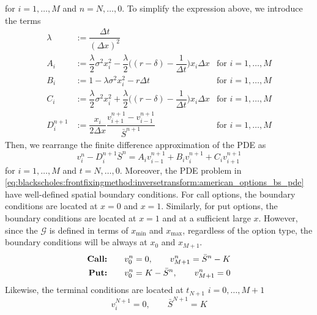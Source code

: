 for $i = 1, \dots, M$ and $n = N, \dots, 0$. To simplify the expression above, we introduce the terms 
\begin{align*}
  \lambda &:= \dfrac{\Delta{t}}{(\Delta{x})^2} \\
  A_i &:= \dfrac{\lambda}{2}\sigma^2x^{2}_i - \dfrac{\lambda}{2}\bigg((r-\delta) - \dfrac{1}{\Delta{t}}\bigg)x_i\Delta{x} & \text{for $i = 1, \dots, M$} \\ 
  B_i &:= 1 - \lambda\sigma^2x_i^2 - r\Delta{t} & \text{for $i = 1, \dots, M$} \\
  C_i &:= \dfrac{\lambda}{2}\sigma^2x^{2}_i + \dfrac{\lambda}{2}\bigg((r-\delta) - \dfrac{1}{\Delta{t}}\bigg)x_i\Delta{x} &  \text{for $i = 1, \dots, M$} \\
  D^{n+1}_{i} &:= \dfrac{x_i}{2\Delta{x}}\dfrac{v^{n+1}_{i+1} - v^{n+1}_{i-1}}{\bar{S}^{n+1}} &  \text{for $i = 1, \dots, M$}
\end{align*}
Then, we rearrange the finite difference approximation of the PDE as 
\begin{equation}
  v^{n}_{i} - D^{n+1}_{i}\bar{S}^n = A_i v^{n+1}_{i-1} + B_{i}v^{n+1}_{i} + C_{i}v^{n+1}_{i+1}
  \label{eq:finitediferencesschemes:explicit:pde_simplified}
\end{equation}
for $i = 1, \dots, M$ and $t = N, \dots, 0$. Moreover, the PDE problem in \eqref{eq:blackscholes:frontfixingmethod:inversetransform:american_options_bs_pde} have well-defined spatial boundary conditions. For call options, the boundary conditions are located at $x=0$ and $x=1$. Similarly, for put options, the boundary conditions are located at $x=1$ and at a sufficient large $x$. However, since the $\mathcal{G}$ is defined in terms of $x_\text{min}$ and $x_\text{max}$, regardless of the option type, the boundary conditions will be always at $x_0$ and $x_{M+1}$.
\begin{subequations}
  \label{eq:finitediferencesschemes:explicit:boundary_conditions}
  \begin{align}
    \text{\textbf{Call:}} \qquad & v^{n}_{0} = 0, \qquad v^{n}_{M+1} = \bar{S}^{n} - K\\
    \text{\textbf{Put:}} \qquad & v^{n}_{0} = K - \bar{S}^{n}, \qquad v^{n}_{M+1} = 0
  \end{align}
\end{subequations}
Likewise, the terminal conditions are located at $t_{N+1}$ $i=0,\dots,M+1$
\begin{subequations}
  \label{eq:finitediferencesschemes:explicit:terminal_conditions}
  \begin{equation}
    v^{N+1}_{i} = 0, \qquad \bar{S}^{N+1} = K
  \end{equation}
\end{subequations}
